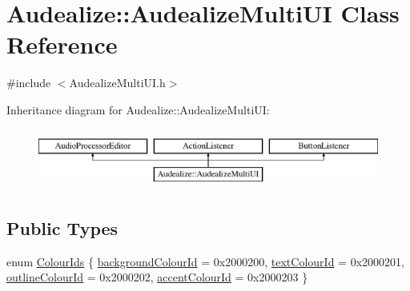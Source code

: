 \hypertarget{class_audealize_1_1_audealize_multi_u_i}{}\section{Audealize\+:\+:Audealize\+Multi\+UI Class Reference}
\label{class_audealize_1_1_audealize_multi_u_i}


{\ttfamily \#include $<$Audealize\+Multi\+U\+I.\+h$>$}

Inheritance diagram for Audealize\+:\+:Audealize\+Multi\+UI\+:\begin{figure}[H]
\begin{center}
\leavevmode
\includegraphics[height=2.000000cm]{class_audealize_1_1_audealize_multi_u_i}
\end{center}
\end{figure}
\subsection*{Public Types}
\begin{DoxyCompactItemize}
\item 
enum \hyperlink{class_audealize_1_1_audealize_multi_u_i_a01035122e067982c82c8f5089904664e}{Colour\+Ids} \{ \hyperlink{class_audealize_1_1_audealize_multi_u_i_a01035122e067982c82c8f5089904664ea2b0d2df5e6ab5243d08f5090d47a8bb2}{background\+Colour\+Id} = 0x2000200, 
\hyperlink{class_audealize_1_1_audealize_multi_u_i_a01035122e067982c82c8f5089904664eaf0d4a96439bd092d6e314fa9ef6b7101}{text\+Colour\+Id} = 0x2000201, 
\hyperlink{class_audealize_1_1_audealize_multi_u_i_a01035122e067982c82c8f5089904664ea8060121e236497f75f7e0742a486e77e}{outline\+Colour\+Id} = 0x2000202, 
\hyperlink{class_audealize_1_1_audealize_multi_u_i_a01035122e067982c82c8f5089904664ea15aae76df19e38f6dee3d232eda5ebd9}{accent\+Colour\+Id} = 0x2000203
 \}
\end{DoxyCompactItemize}
